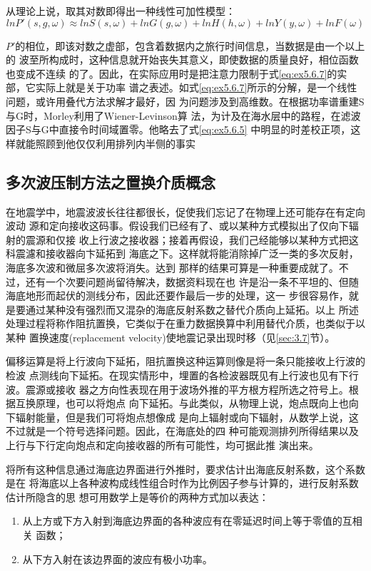 从理论上说，取其对数即得出一种线性可加性模型：
\begin{equation}
lnP'(s,g,\omega)\approx lnS(s,\omega)+
lnG(g,\omega)+lnH(h,\omega)+lnY(y,\omega)+lnF(\omega)
\label{eq:ex5.6.7}
\end{equation}

$P'$的相位，即该对数之虚部，包含着数据内之旅行时间信息，当数据是由一个以上的
波至所构成时，这种信息就开始丧失其意义，即使数据的质量良好，相位函数也变成不连续
的了。因此，在实际应用时是把注意力限制于式\ref{eq:ex5.6.7}的实部，它实际上就是关于功率
谱之表述。如式\ref{eq:ex5.6.7}所示的分解，是一个线性问题，或许用叠代方法求解才最好，因
为问题涉及到高维数。在根据功率谱重建S与G时，Morley利用了Wiener-Levinson算
法，为计及在海水层中的路程，在滤波因子S与G中直接令时间域置零。他略去了式\ref{eq:ex5.6.5}
中明显的时差校正项，这样就能照顾到他仅仅利用排列内半侧的事实


\subsection{多次波压制方法之置换介质概念}
\label{sec:5.6.8}

在地震学中，地震波波长往往都很长，促使我们忘记了在物理上还可能存在有定向波动
源和定向接收这码事。假设我们已经有了、或以某种方式模拟出了仅向下辐射的震源和仅接
收上行波之接收器；接着再假设，我们己经能够以某种方式把这科震濾和接收器向卞延拓到
海底之下。这样就将能消除掉广泛一类的多次反射，海底多次波和微屈多次波将消失。达到
那样的结果可算是一种重要成就了。不过，还有一个次要问题尚留待解决，数据资料现在也
许是沿一条不平坦的、但随海底地形而起伏的测线分布，因此还要作最后一步的处理，这一
步很容易作，就是要通过某种没有强烈而又混杂的海底反射系数之替代介质向上延拓。以上
所述处理过程将称作阻抗置换，它类似于在重力数据换算中利用替代介质，也类似于以某种
置换速度(replacement velocity)使地震记录出现时移（见\ref{sec:3.7}节）。

偏移运算是将上行波向下延拓，阻抗置换这种运算则像是将一条只能接收上行波的检波
点测线向下延拓。在现实情形中，埋置的各检波器既见有上行波也见有下行波。震源或接收
器之方向性表现在用于波场外推的平方根方程所选之符号上。根据互换原理，也可以将炮点
向下延拓。与此类似，从物理上说，炮点既向上也向下辐射能量，但是我们可将炮点想像成
是向上辐射或向下辐射，从数学上说，这不过就是一个符号选择问题。因此，在海底处的四
种可能观测排列所得结果以及上行与下行定向炮点和定向接收器的所有可能性，均可据此推
演出来。

将所有这种信息通过海底边界面进行外推时，要求估计出海底反射系数，这个系数是在
将海底以上各种波构成线性组合时作为比例因子参与计算的，进行反射系数估计所隐含的思
想可用数学上是等价的两种方式加以表达：
\begin{enumerate}
\item 从上方或下方入射到海底边界面的各种波应有在零延迟时间上等于零值的互相关
函数；
\item 从下方入射在该边界面的波应有极小功率。
\end{enumerate}

